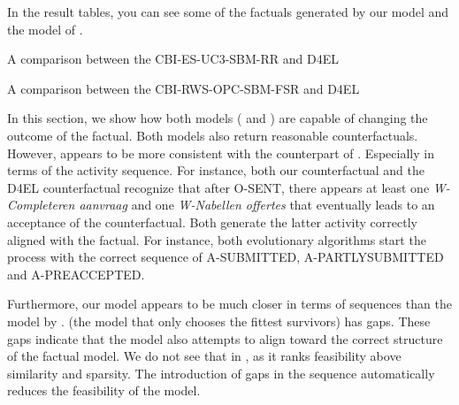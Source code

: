 \documentclass[./../../paper.tex]{subfiles}
\begin{document}
In the result tables, you can see some of the factuals generated by our model and the model of \autocite{hsieh_DiCE4ELInterpretingProcess_2021}.  

\begin{table}
    \centering    
    \resizebox{\linewidth}{!}{
    
    }
    \caption{A comparison between the CBI-ES-UC3-SBM-RR and D4EL}
    \label{fig:exp7-RR}
\end{table}
\begin{table}
    \centering    
    \resizebox{\linewidth}{!}{
    
    }
\caption{A comparison between the CBI-RWS-OPC-SBM-FSR and D4EL}
\label{fig:exp7-FSR}
\end{table}

% 

% 

% 

In this section, we show how both models ( and ) are capable of changing the outcome of the factual. Both models also return reasonable counterfactuals. However,  appears to be more consistent with the counterpart of \autocite{hsieh_DiCE4ELInterpretingProcess_2021}. Especially in terms of the activity sequence. 
For instance, both our counterfactual and the D4EL counterfactual recognize that after O-SENT, there appears at least one \emph{W-Completeren aanvraag} and one \emph{W-Nabellen offertes} that eventually leads to an acceptance of the counterfactual. Both generate the latter activity correctly aligned with the factual. 
For instance, both evolutionary algorithms start the process with the correct sequence of A-SUBMITTED, A-PARTLYSUBMITTED and A-PREACCEPTED. 

Furthermore, our model appears to be much closer in terms of sequences than the model by \citeauthor{hsieh_DiCE4ELInterpretingProcess_2021}.  (the model that only chooses the fittest survivors) has gaps. These gaps indicate that the model also attempts to align toward the correct structure of the factual model. We do not see that in , as it ranks feasibility above similarity and sparsity. The introduction of gaps in the sequence automatically reduces the feasibility of the model. 
\end{document}
